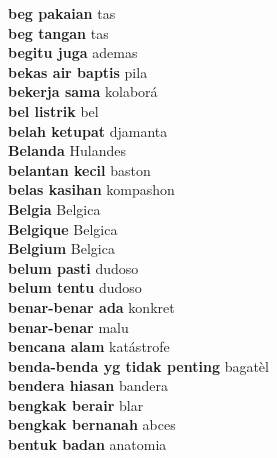 \textbf{ beg pakaian  } tas \\
\textbf{ beg tangan  } tas \\
\textbf{ begitu juga  } ademas \\
\textbf{ bekas air baptis  } pila \\
\textbf{ bekerja sama  } kolaborá \\
\textbf{ bel listrik  } bel \\
\textbf{ belah ketupat  } djamanta \\
\textbf{ Belanda  } Hulandes \\
\textbf{ belantan kecil  } baston \\
\textbf{ belas kasihan  } kompashon \\
\textbf{ Belgia  } Belgica \\
\textbf{ Belgique  } Belgica \\
\textbf{ Belgium  } Belgica \\
\textbf{ belum pasti  } dudoso \\
\textbf{ belum tentu  } dudoso \\
\textbf{ benar-benar ada  } konkret \\
\textbf{ benar-benar  } malu \\
\textbf{ bencana alam  } katástrofe \\
\textbf{ benda-benda yg tidak penting  } bagatèl \\
\textbf{ bendera hiasan  } bandera \\
\textbf{ bengkak berair  } blar \\
\textbf{ bengkak bernanah  } abces \\
\textbf{ bentuk badan  } anatomia \\
